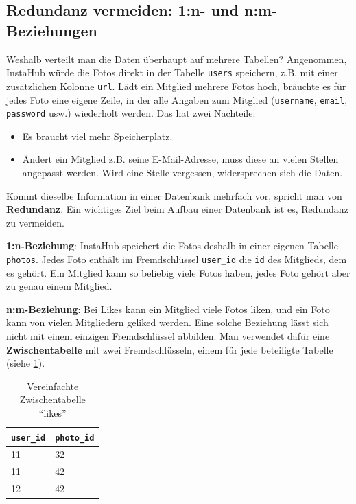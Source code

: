 \subsection{Redundanz vermeiden: 1:n- und n:m-Beziehungen}\label{subsec:redundanz}
Weshalb verteilt man die Daten überhaupt auf mehrere Tabellen? Angenommen, InstaHub würde die Fotos direkt in der Tabelle \texttt{users} speichern, z.B. mit einer zusätzlichen Kolonne \texttt{url}. Lädt ein Mitglied mehrere Fotos hoch, bräuchte es für jedes Foto eine eigene Zeile, in der alle Angaben zum Mitglied (\texttt{username}, \texttt{email}, \texttt{password} usw.) wiederholt werden. Das hat zwei Nachteile:
\begin{itemize}
  \item Es braucht viel mehr Speicherplatz.
  \item Ändert ein Mitglied z.B. seine E-Mail-Adresse, muss diese an vielen Stellen angepasst werden. Wird eine Stelle vergessen, widersprechen sich die Daten.
\end{itemize}
Kommt dieselbe Information in einer Datenbank mehrfach vor, spricht man von \textbf{Redundanz}. Ein wichtiges Ziel beim Aufbau einer Datenbank ist es, Redundanz zu vermeiden.

\textbf{1:n-Beziehung}: InstaHub speichert die Fotos deshalb in einer eigenen Tabelle \texttt{photos}. Jedes Foto enthält im Fremdschlüssel \texttt{user\_id} die \texttt{id} des Mitglieds, dem es gehört. Ein Mitglied kann so beliebig viele Fotos haben, jedes Foto gehört aber zu genau einem Mitglied.

\textbf{n:m-Beziehung}: Bei Likes kann ein Mitglied viele Fotos liken, und ein Foto kann von vielen Mitgliedern geliked werden. Eine solche Beziehung lässt sich nicht mit einem einzigen Fremdschlüssel abbilden. Man verwendet dafür eine \textbf{Zwischentabelle} mit zwei Fremdschlüsseln, einem für jede beteiligte Tabelle (siehe \cref{table:likes}).

\begin{table}[H]
  \centering
  \begin{tabular}{l|l}
    \faKey{} \texttt{user\_id} & \faKey{} \texttt{photo\_id} \\\midrule
    11                         & 32                          \\
    11                         & 42                          \\
    12                         & 42                          \\
  \end{tabular}
  \caption{Vereinfachte Zwischentabelle \enquote{likes}}
  \label{table:likes}
\end{table}


